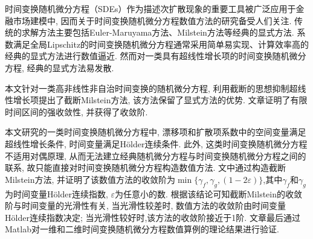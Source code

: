 

\begin{cnabstract}

时间变换随机微分方程（SDEs）作为描述次扩散现象的重要工具被广泛应用于金融市场建模中, 因而关于时间变换随机微分方程数值方法的研究备受人们关注. 传统的求解方法主要包括Euler-Maruyama方法、Milstein方法等经典的显式方法. 系数满足全局Lipschitz的时间变换随机微分方程通常采用简单易实现、计算效率高的经典的显式方法进行数值逼近. 然而对一类具有超线性增长项的时间变换随机微分方程, 经典的显式方法易发散. 

本文针对一类高非线性非自治时间变换的随机微分方程, 利用截断的思想抑制超线性增长项提出了截断Milstein方法, 该方法保留了显式方法的优势. 文章证明了有限时间区间的强收敛性, 并获得了收敛阶. 

本文研究的一类时间变换随机微分方程中, 漂移项和扩散项系数中的空间变量满足超线性增长条件, 时间变量满足H{\"o}lder连续条件. 此外, 这类时间变换随机微分方程不适用对偶原理, 从而无法建立经典随机微分方程与时间变换随机微分方程之间的联系, 故只能直接对时间变换随机微分方程构造数值方法. 文中通过构造截断Milstein方法, 并证明了该数值方法的收敛阶为${\min\{\gamma_f,\gamma_g,(1-2\varepsilon)\}}$,其中$\gamma_f$和$\gamma_g$为时间变量H{\"o}lder连续指数, $\varepsilon$为任意小的数. 根据该结论可知截断Milstein的收敛阶与时间变量的光滑性有关, 当光滑性较差时, 数值方法的收敛阶由时间变量H{\"o}lder连续指数决定; 当光滑性较好时,该方法的收敛阶接近于1阶.
文章最后通过Matlab对一维和二维时间变换随机微分方程数值算例的理论结果进行验证. 

\end{cnabstract}

